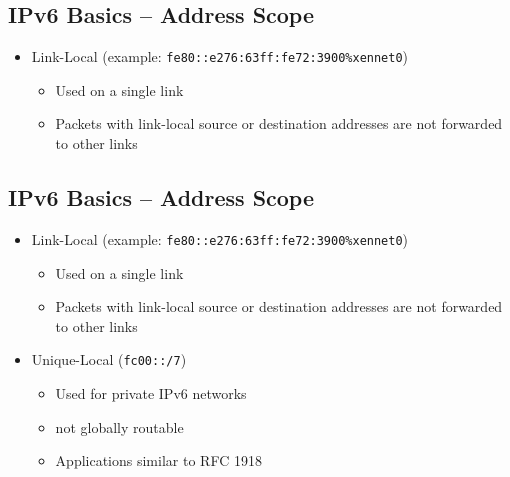 \documentclass[xga]{xdvislides}
\begin{document}
\subsection{IPv6 Basics -- Address Scope}
\begin{itemize}
	\item Link-Local (example: \verb+fe80::e276:63ff:fe72:3900%xennet0+)
		\begin{itemize}
			\item Used on a single link
			\item Packets with link-local source or destination addresses are not
				forwarded to other links
		\end{itemize}
\end{itemize}

\subsection{IPv6 Basics -- Address Scope}
\begin{itemize}
	\item Link-Local (example: \verb+fe80::e276:63ff:fe72:3900%xennet0+)
		\begin{itemize}
			\item Used on a single link
			\item Packets with link-local source or destination addresses are not
				forwarded to other links
		\end{itemize}
	\item Unique-Local (\verb+fc00::/7+)
		\begin{itemize}
			\item Used for private IPv6 networks
			\item not globally routable
			\item Applications similar to RFC 1918
		\end{itemize}
\end{itemize}
\end{document}
